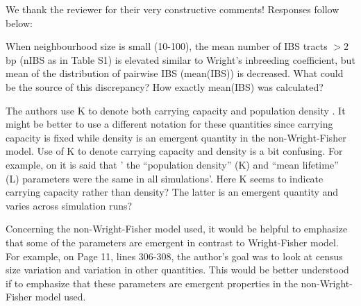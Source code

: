 We thank the reviewer for their very constructive comments!
Responses follow below:

\begin{point}{}
    When neighbourhood size is small (10-100), the mean number of IBS tracts ${}>2$bp (nIBS as in Table S1) is elevated similar to Wright's inbreeding coefficient, but mean of the distribution of pairwise IBS (mean(IBS)) is decreased. What could be the source of this discrepancy? How exactly mean(IBS) was calculated?
\end{point}


\begin{point}{}
    The authors use K to denote both carrying capacity 
    and population density . 
    It might be better to use a different notation for these quantities since carrying capacity is fixed while density is an emergent quantity in the non-Wright-Fisher model. Use of K to denote carrying capacity and density is a bit confusing. For example, on  it is said that ' the ``population density'' (K) and ``mean lifetime'' (L) parameters were the same in all simulations'. Here K seems to indicate carrying capacity rather than density? The latter is an emergent quantity and varies across simulation runs?
\end{point}


\begin{point}{}
    Concerning the non-Wright-Fisher model used, it would be helpful to emphasize that some of the parameters are emergent in contrast to Wright-Fisher model. For example, on Page 11, lines 306-308, the author's goal was to look at census size variation and variation in other quantities. This would be better understood if to emphasize that these parameters are emergent properties in the non-Wright-Fisher model used.
\end{point}

